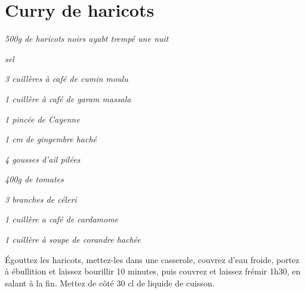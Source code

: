 \documentclass[10pt,a4paper]{report}
\begin{document}
    \newpage
    \section{Curry de haricots}

    \begin{multicols}{2}
        \parbox[1cm]{\textwidth}{
            \begin{description}
                \item \textit{500g de haricots noirs ayabt trempé une nuit}
                \item \textit{sel}
                \item \textit{3 cuillères à café de cumin moulu}
                \item \textit{1 cuillère à café de garam massala}
                \item \textit{1 pincée de Cayenne}
                \item \textit{1 cm de gingembre haché}
                \item \textit{4 gousses d'ail pilées}
                \item \textit{400g de tomates}
                \item \textit{3 branches de céleri}
                \item \textit{1 cuillère a café de cardamome}
                \item \textit{1 cuillère à soupe de corandre hachée}
            \end{description}
        }
        \columnbreak

        Égouttez les haricots, mettez-les dans une casserole, couvrez d'eau froide, portez à ébullition et laissez bourillir 10 minutes, puis couvrez et laissez frémir 1h30, en salant à la fin. Mettez de côté 30 cl de liquide de cuisson.
        \newline


\end{multicols}
\end{document}
